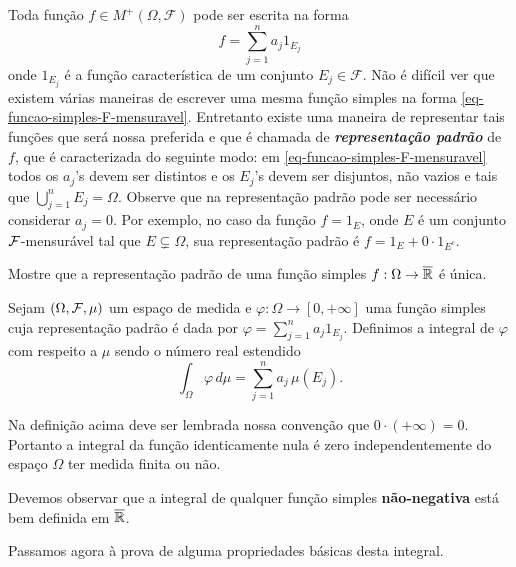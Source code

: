 Toda função  
$f\in M^{+}(\Omega,\mathcal{F})$ 
pode ser escrita na forma 
\begin{equation}\label{eq-funcao-simples-F-mensuravel}
f=\sum_{j=1}^{n}a_j 1_{E_j}
\end{equation}
onde $1_{E_j}$ é a função característica de um conjunto $E_j\in \mathcal{F}$. 
Não é difícil ver que existem várias maneiras de 
escrever uma mesma função simples na 
forma \eqref{eq-funcao-simples-F-mensuravel}. 
Entretanto existe uma maneira de
representar tais funções que será nossa preferida 
e que é chamada de
{\bf \emph{representação padrão}}
 de $f$, 
que é caracterizada do seguinte modo: 
em \eqref{eq-funcao-simples-F-mensuravel} 
todos os $a_j$'s devem ser distintos e os $E_j$'s devem ser disjuntos, 
não vazios e tais que $\bigcup_{j=1}^nE_j=\Omega$. 
Observe que na representação padrão pode ser necessário
considerar $a_j=0$. Por exemplo, no caso da função 
$f = 1_{E}$, onde $E$ é um conjunto $\mathcal{F}$-mensurável tal
que $E\subsetneq \Omega$, sua representação padrão 
é $f=1_{E} + 0\cdot 1_{E^c}$.
%
%
\begin{exercicio}
Mostre que a representação padrão de uma função 
simples $f:\Omega\to\overline{\mathbb{R}}$ é única.
\end{exercicio}
%
%
%
%
\begin{definicao}
\label{def-integral-funcao-simples-positiva}
Sejam $(\Omega,\mathcal{F},\mu)$ um espaço de medida e 
$\varphi:\Omega\to [0,+\infty]$ uma função simples cuja representação 
padrão é dada por $\varphi = \sum_{j=1}^n a_j1_{E_j}$.
Definimos a integral de $\varphi$ com respeito a $\mu$ 
sendo o número real estendido 
	\[
		\int_{\Omega} \varphi \, d\mu 
		=
		\sum_{j=1}^n a_j\, \mu(E_j).
	\]
\end{definicao}

Na definição acima deve ser lembrada nossa convenção 
que $0\cdot(+\infty)=0$. Portanto a integral da 
função identicamente nula é zero independentemente do 
espaço $\Omega$ ter medida finita ou não. 

Devemos observar que a integral de qualquer função 
simples \textbf{não-negativa} está bem definida em $\overline{\mathbb{R}}$.


Passamos agora à prova de alguma propriedades 
básicas desta integral.








